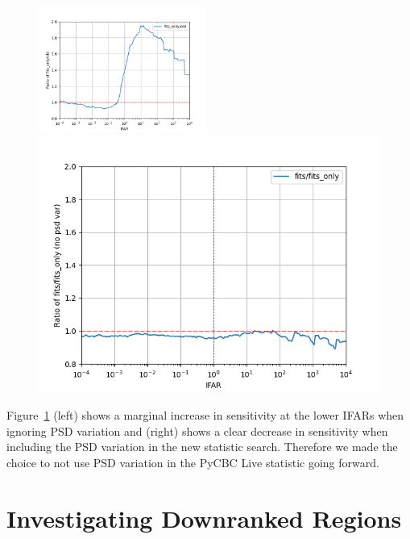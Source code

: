 \begin{figure}
  \centering
  \begin{minipage}[t]{1.0\linewidth}
  \includegraphics[width=0.49\textwidth]{images/pycbclive/fo_vs_o.png}
  \hspace{0.01\linewidth}
  \includegraphics[width=0.49\linewidth]{images/pycbclive/f_vs_fo.png}
  \end{minipage}
  \caption{}
  \label{fig:pycbclive-sensitivity-comparisons}
\end{figure}
%
Figure~\ref{fig:pycbclive-sensitivity-comparisons} (left) shows a marginal increase in sensitivity at the lower IFARs when ignoring PSD variation and (right) shows a clear decrease in sensitivity when including the PSD variation in the new statistic search. Therefore we made the choice to not use PSD variation in the PyCBC Live statistic going forward.

\section{\label{pycbclive-false-alarms}Investigating Downranked Regions}

